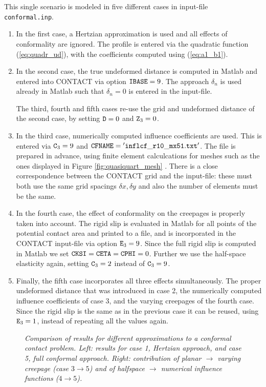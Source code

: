 \documentclass[12pt]{report}
\begin{document}
This single scenario is modeled in five different cases in input-file {\tt
conformal.inp}.
\begin{enumerate}
\item In the first case, a Hertzian approximation is used and all effects
of conformality are ignored. The profile is entered via the quadratic
function (\ref{eq:quadr_ud}), with the coefficients computed using
(\ref{eq:a1_b1}).
\item In the second case, the true undeformed distance is computed in
Matlab and entered into CONTACT via option ${\tt IBASE}=9$. The approach
$\delta_n$ is used already in Matlab such that $\delta_n=0$ is entered in the
input-file.

The third, fourth and fifth cases re-use the grid and undeformed
distance of the second case, by setting ${\tt D}=0$ and ${\tt Z}_3=0$.

\item In the third case, numerically computed influence coefficients are
used. This is entered via ${\tt C}_3=9$ and ${\tt CFNAME}={\tt
'inflcf\_r10\_mx51.txt'}$. The file is prepared in advance, using finite
element calculcations for meshes such as the ones displayed in Figure
\ref{fig:quasiquart_mesh} \cite{Vollebregt2014d-conformal}. There is a
close correspondence between the CONTACT grid and the input-file: these
must both use the same grid spacings $\delta x, \delta y$ and also the
number of elements must be the same.

\item In the fourth case, the effect of conformality on the creepages is
properly taken into account. The rigid slip is evaluated in Matlab for
all points of the potential contact area and printed to a file, and is
incorporated in the CONTACT input-file via option ${\tt E}_3=9$. Since the
full rigid slip is computed in Matlab we set ${\tt CKSI}={\tt CETA}={\tt
CPHI}=0$. Further we use the half-space elasticity again, setting ${\tt
C}_3=2$ instead of ${\tt C}_3=9$.

\item Finally, the fifth case incorporates all three effects
simultaneously. The proper undeformed distance that was introduced in case
2, the numerically computed influence coefficients of case 3, and the
varying creepages of the fourth case. Since the rigid slip is the same as
in the previous case it can be reused, using ${\tt E}_3=1$, instead of
repeating all the values again.
\end{enumerate}

\begin{figure}[bt]
\centering
{}
\caption{\em Comparison of results for different approximations to a
conformal contact problem. Left: results for case 1, Hertzian approach, and
case 5, full conformal approach. Right: contribution of planar $\rightarrow$
varying creepage (case $3\rightarrow 5$) and of halfspace $\rightarrow$
numerical influence functions ($4 \rightarrow 5$).}
\label{fig:conformal}
\end{figure}
\end{document}
